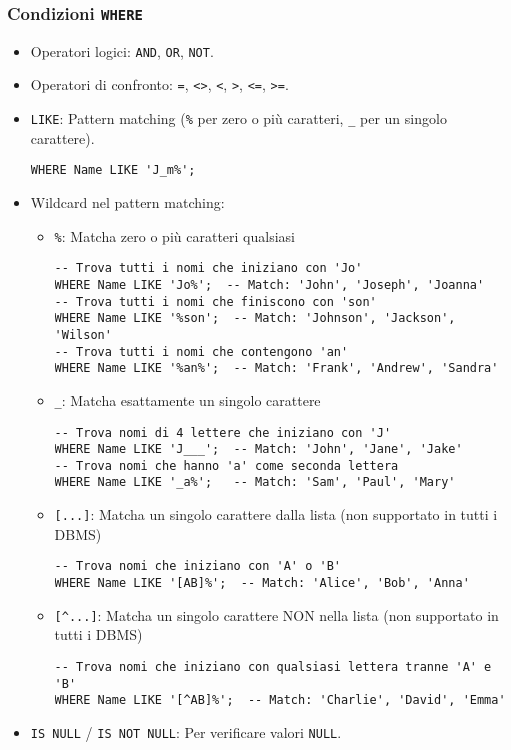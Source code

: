 \subsubsection{Condizioni \texttt{WHERE}}
\begin{itemize}
	\item Operatori logici: \texttt{AND}, \texttt{OR}, \texttt{NOT}.
	\item Operatori di confronto: \texttt{=}, \texttt{<>}, \texttt{<}, \texttt{>}, \texttt{<=}, \texttt{>=}.
	\item \texttt{LIKE}: Pattern matching (\texttt{\%} per zero o più caratteri, \texttt{\_} per un singolo carattere).
	\begin{verbatim}
WHERE Name LIKE 'J_m%';
	\end{verbatim}
	\item Wildcard nel pattern matching:
	\begin{itemize}
		\item \texttt{\%}: Matcha zero o più caratteri qualsiasi
		\begin{verbatim}
-- Trova tutti i nomi che iniziano con 'Jo'
WHERE Name LIKE 'Jo%';  -- Match: 'John', 'Joseph', 'Joanna'
-- Trova tutti i nomi che finiscono con 'son'
WHERE Name LIKE '%son';  -- Match: 'Johnson', 'Jackson', 'Wilson'
-- Trova tutti i nomi che contengono 'an'
WHERE Name LIKE '%an%';  -- Match: 'Frank', 'Andrew', 'Sandra'
		\end{verbatim}
		\item \texttt{\_}: Matcha esattamente un singolo carattere
		\begin{verbatim}
-- Trova nomi di 4 lettere che iniziano con 'J'
WHERE Name LIKE 'J___';  -- Match: 'John', 'Jane', 'Jake'
-- Trova nomi che hanno 'a' come seconda lettera
WHERE Name LIKE '_a%';   -- Match: 'Sam', 'Paul', 'Mary'
		\end{verbatim}
		\item \texttt{[...]}: Matcha un singolo carattere dalla lista (non supportato in tutti i DBMS)
		\begin{verbatim}
-- Trova nomi che iniziano con 'A' o 'B'
WHERE Name LIKE '[AB]%';  -- Match: 'Alice', 'Bob', 'Anna'
		\end{verbatim}
		\item \texttt{[\^{}...]}: Matcha un singolo carattere NON nella lista (non supportato in tutti i DBMS)
		\begin{verbatim}
-- Trova nomi che iniziano con qualsiasi lettera tranne 'A' e 'B'
WHERE Name LIKE '[^AB]%';  -- Match: 'Charlie', 'David', 'Emma'
		\end{verbatim}
	\end{itemize}
	\item \texttt{IS NULL} / \texttt{IS NOT NULL}: Per verificare valori \texttt{NULL}.
\end{itemize}

